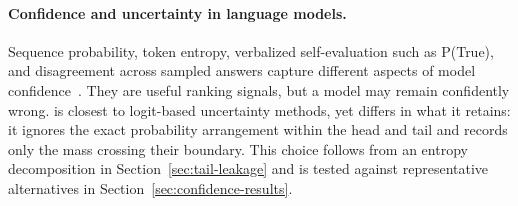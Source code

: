 \paragraph{Confidence and uncertainty in language models.}
Sequence probability, token entropy, verbalized self-evaluation such as
P(True), and disagreement across sampled answers capture different aspects of
model confidence~\citep{kadavath2022,semanticuncertainty,semanticentropy}.
They are useful ranking signals, but a model may remain confidently wrong.
\tailleak{} is closest to logit-based uncertainty methods, yet differs in what
it retains: it ignores the exact probability arrangement within the head and
tail and records only the mass crossing their boundary. This choice follows
from an entropy decomposition in Section~\ref{sec:tail-leakage} and is tested
against representative alternatives in Section~\ref{sec:confidence-results}.
